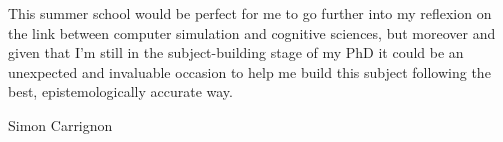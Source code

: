 \documentclass[a4paper]{lettre}
\begin{document}
This summer school would be perfect for me to go further into my reflexion on the link between computer simulation and cognitive sciences, but moreover and given that I'm still in the subject-building stage of my PhD it could be an unexpected and invaluable occasion to help me build this subject following the best, epistemologically accurate way. 


\vspace{1.5cm}

Simon Carrignon
\end{document}
